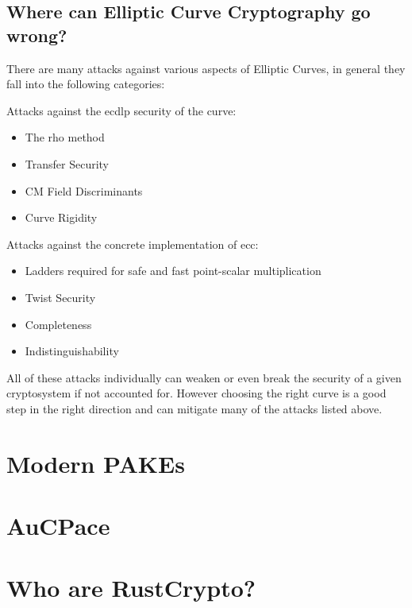 \subsection{Where can Elliptic Curve Cryptography go wrong?}
There are many attacks against various aspects of Elliptic Curves, in general they fall into the following categories:
\begin{itemize}
  \begin{item}
    Attacks against the \gls{ecdlp} security of the curve:
    \begin{itemize}
      \item{The rho method\cite{pollard-rho}}
      \item{Transfer Security\cite{multiplicative-transfer-attack,additive-transfer-attack}}
      \item{CM Field Discriminants\cite{safecurves}}
      \item{Curve Rigidity\cite{curve-rigidity}}
    \end{itemize}
  \end{item}
  \begin{item}
    Attacks against the concrete implementation of \gls{ecc}:
    \begin{itemize}
      \item{Ladders required for safe and fast point-scalar multiplication\cite{safecurves}}
      \item{Twist Security\cite{small-subgroup-attack,invalid-curve-attack}}
      \item{Completeness\cite{completeness-attack}}
      \item{Indistinguishability\cite{elligator2}}
    \end{itemize}
  \end{item}
\end{itemize}

All of these attacks individually can weaken or even break the security of a given cryptosystem if not accounted for.
However choosing the right curve is a good step in the right direction and can mitigate many of the attacks listed above.

\section{Modern PAKEs}
\section{AuCPace}
\section{Who are RustCrypto?}
